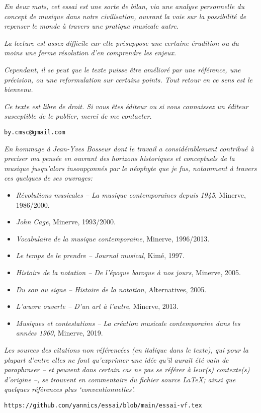 \documentclass{article}
\begin{document}
{\footnotesize
\vspace*{2cm}
 \textsl{En deux mots, cet essai est une sorte de bilan, via une analyse personnelle du concept de musique dans notre civilisation, ouvrant la voie sur la possibilité de repenser le monde à travers une pratique musicale autre.}
\bigskip

\textsl{La lecture est assez difficile car elle présuppose une certaine érudition ou du moins une ferme résolution d’en comprendre les enjeux. }
\bigskip

\textsl{Cependant, il se peut que le texte puisse être amélioré par une référence, une précision, ou une reformulation sur certains points. Tout retour en ce sens est le bienvenu.}
\bigskip

\textsl{Ce texte est libre de droit. Si vous êtes éditeur ou si vous connaissez un éditeur susceptible de le publier, merci de me contacter.}
\bigskip

\texttt{by.cmsc@gmail.com}

\bigskip
\bigskip

\textsl{En hommage à Jean-Yves Bosseur dont le travail a considérablement contribué à preciser ma pensée en ouvrant des horizons historiques et conceptuels de la musique jusqu’alors insoupçonnés par le néophyte que je fus, notamment à travers ces quelques de ses ouvrages:}

\begin{itemize}[topsep=0mm,itemsep=0mm]
\item \textit{Révolutions musicales -- La musique contemporaines depuis 1945}, Minerve, {1986/2000}.
\item \textit{John Cage}, Minerve, {1993/2000}.
\item \textit{Vocabulaire de la musique contemporaine}, Minerve, {1996/2013}.
\item \textit{Le temps de le prendre -- Journal musical}, Kimé, 1997.
\item \textit{Histoire de la notation -- De l'époque baroque à nos jours}, Minerve, 2005.
\item \textit{Du son au signe -- Histoire de la notation}, Alternatives, 2005.
\item \textit{L'œuvre ouverte -- D'un art à l'autre}, Minerve, 2013.
\item \textit{Musiques et contestations -- La création musicale contemporaine dans les années 1960}, Minerve, 2019.
\end{itemize}

\bigskip
\textsl{Les sources des citations non référencées (en italique dans le texte), qui pour la plupart d’entre elles ne font qu’exprimer une idée qu’il aurait été vain de paraphraser -- et peuvent dans certain cas ne pas se référer à leur(s) contexte(s) d’origine --, se trouvent en commentaire du fichier source \LaTeX; ainsi que quelques références plus `conventionnelles'.}

\bigskip
\texttt{https://github.com/yannics/essai/blob/main/essai-vf.tex}}
\end{document}

